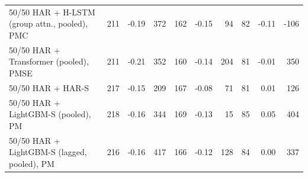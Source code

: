 \begin{tabular}{lrrrrrrrrr}
50/50 HAR + H-LSTM (group attn., pooled), PMC & 211 & -0.19 & 372 & 162 & -0.15 & 94 & 82 & -0.11 & -106 \\
50/50 HAR + Transformer (pooled), PMSE & 211 & -0.21 & 352 & 160 & -0.14 & 204 & 81 & -0.01 & 350 \\
50/50 HAR + HAR-S & 217 & -0.15 & 209 & 167 & -0.08 & 71 & 81 & 0.01 & 126 \\
50/50 HAR + LightGBM-S (pooled), PM & 218 & -0.16 & 344 & 169 & -0.13 & 15 & 85 & 0.05 & 404 \\
50/50 HAR + LightGBM-S (lagged, pooled), PM & 216 & -0.16 & 417 & 166 & -0.12 & 128 & 84 & 0.00 & 337 \\
\bottomrule
\end{tabular}
